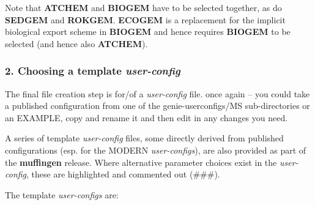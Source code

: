 \documentclass[11pt,fleqn]{book} %
\begin{document}
\noindent Note that \textbf{ATCHEM} and \textbf{BIOGEM} have to be selected together, as do \textbf{SEDGEM} and \textbf{ROKGEM}. \textbf{ECOGEM} is a replacement for the implicit biological export scheme in \textbf{BIOGEM} and hence requires \textbf{BIOGEM} to be selected (and hence also \textbf{ATCHEM}).

%
\subsubsection{2. Choosing a template \textit{user-config}}

The final file creation step is for/of a \textit{user-config} file. once again -- you could take a published configuration from one of the \textsf{\footnotesize genie-userconfigs/MS} sub-directories or an EXAMPLE, copy and rename it and then edit in any changes you need. 

A series of template \textit{user-config} files, some directly derived from published configurations (esp. for the MODERN \textit{user-configs}), are also provided as part of the \textbf{muffingen} release. Where alternative parameter choices exist in the \textit{user-config}, these are highlighted and commented out (\#\#\#).

The template \textit{user-configs} are:
\end{document}
